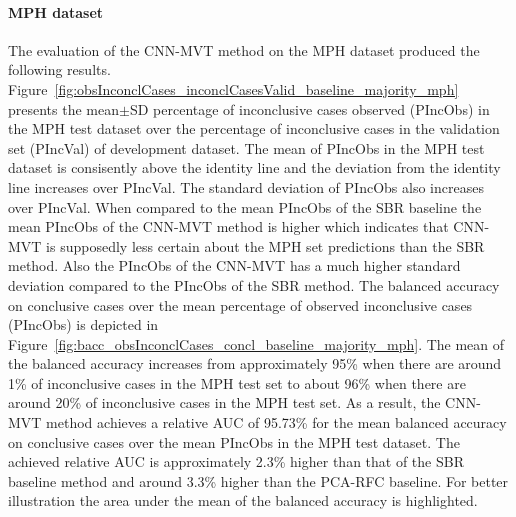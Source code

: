 
\paragraph{MPH dataset}

The evaluation of the CNN-MVT method on the MPH dataset produced the following results.
Figure~\ref{fig:obsInconclCases_inconclCasesValid_baseline_majority_mph} presents
the mean$\pm$SD percentage of inconclusive cases observed (PIncObs) in the MPH test dataset 
over the percentage of inconclusive cases in the validation set (PIncVal) of development dataset.
The mean of PIncObs in the MPH test dataset is consisently above the identity line 
and the deviation from the identity line increases over PIncVal.
The standard deviation of PIncObs also increases over PIncVal.
When compared to the mean PIncObs of the SBR baseline the mean PIncObs of the CNN-MVT method is higher 
which indicates that CNN-MVT is supposedly less certain about the MPH set predictions than the SBR method.
Also the PIncObs of the CNN-MVT has a much higher standard deviation compared to the PIncObs of the SBR method.
The balanced accuracy on conclusive cases over the mean percentage of observed inconclusive cases (PIncObs) is depicted 
in Figure~\ref{fig:bacc_obsInconclCases_concl_baseline_majority_mph}.
The mean of the balanced accuracy increases from approximately 95\% 
when there are around 1\% of inconclusive cases in the MPH test set to about 96\% 
when there are around 20\% of inconclusive cases in the MPH test set.
As a result, the CNN-MVT method achieves a relative AUC of 95.73\% for the mean balanced accuracy on conclusive cases 
over the mean PIncObs in the MPH test dataset.
The achieved relative AUC is approximately 2.3\% higher than that of the SBR baseline method 
and around 3.3\% higher than the PCA-RFC baseline.
For better illustration the area under the mean of the balanced accuracy is highlighted.


